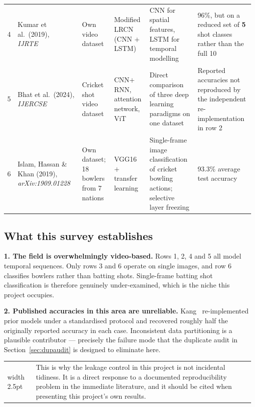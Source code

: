 \documentclass[11pt,a4paper]{article}
\makeatletter
\newenvironment{keybox}
  {\par\medskip\noindent\begin{tabular}{@{}p{0.3em}@{\hspace{0.8em}}p{\dimexpr\linewidth-2.2em}@{}}
   {\color{accent}\vrule width 2.5pt} &}
  {\end{tabular}\par\medskip}
\renewcommand{\arraystretch}{1.25}
\makeatother
\begin{document}
\begin{landscape}
\begin{longtable}{@{}p{0.5cm}p{3.7cm}p{3.0cm}p{3.7cm}p{5.8cm}p{5.0cm}@{}}
4 & Kumar et al.\ (2019), \textit{IJRTE}~\cite{kumar2019}
  & Own video dataset
  & Modified LRCN (CNN $+$ LSTM)
  & CNN for spatial features, LSTM for temporal modelling
  & 96\%, but on a reduced set of \textbf{5} shot classes rather than the full 10 \\
\addlinespace

5 & Bhat et al.\ (2024), \textit{IJERCSE}~\cite{bhat2024}
  & Cricket shot video dataset
  & CNN$+$RNN, attention network, ViT
  & Direct comparison of three deep learning paradigms on one dataset
  & Reported accuracies not reproduced by the independent re-implementation in row 2 \\
\addlinespace

6 & Islam, Hassan \& Khan (2019), \textit{arXiv:1909.01228}~\cite{islam2019}
  & Own dataset; 18 bowlers from 7 nations
  & VGG16 $+$ transfer learning
  & Single-frame image classification of cricket bowling actions; selective layer freezing
  & 93.3\% average test accuracy \\

\end{longtable}
\renewcommand{\arraystretch}{1.25}
\normalsize
\end{landscape}

\subsection{What this survey establishes}

\textbf{1. The field is overwhelmingly video-based.} Rows 1, 2, 4 and 5 all model
temporal sequences. Only rows 3 and 6 operate on single images, and row 6 classifies
bowlers rather than batting shots. Single-frame batting shot classification is therefore
genuinely under-examined, which is the niche this project occupies.

\textbf{2. Published accuracies in this area are unreliable.} Kang~\cite{kang2025}
re-implemented prior models under a standardised protocol and recovered roughly half the
originally reported accuracy in each case. Inconsistent data partitioning is a plausible
contributor --- precisely the failure mode that the duplicate audit in Section~\ref{sec:dupaudit} is
designed to eliminate here.

\begin{keybox}
This is why the leakage control in this project is not incidental tidiness. It is a
direct response to a documented reproducibility problem in the immediate literature, and
it should be cited when presenting this project's own results.
\end{keybox}
\end{document}
